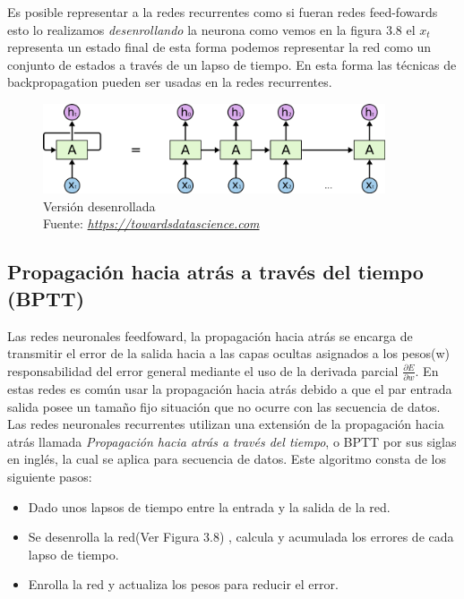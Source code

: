 Es posible representar a la redes recurrentes como si fueran redes feed-fowards esto lo realizamos \textit{desenrollando} la neurona como vemos en la figura 3.8 el $x_{t}$ representa un estado final de esta forma podemos representar la red como un conjunto de estados a través de un lapso de tiempo. En esta forma las técnicas de backpropagation pueden ser usadas en la redes recurrentes.

\begin{figure}[H]
	\centering
	\includegraphics[width=0.9\textwidth]{Figures/rnn2.png}
	\caption{Versión desenrollada \\ Fuente:  \href{https://towardsdatascience.com/introduction-to-recurrent-neural-network-27202c3945f3}{\textit{https://towardsdatascience.com}}}
	\label{}
\end{figure}
\newpage
\subsection{Propagación hacia atrás a través del tiempo (BPTT)}

Las redes neuronales feedfoward, la propagación hacia atrás se encarga de transmitir el error de la salida hacia a las capas ocultas asignados a los pesos(w) responsabilidad del error general mediante el uso de la derivada parcial $\frac{ { \partial } E } { \partial w }$. En estas redes es común usar la propagación hacia atrás debido a que el par entrada salida posee un tamaño fijo situación que no ocurre con las secuencia de datos.\\
 Las redes neuronales recurrentes utilizan una extensión de la propagación hacia atrás llamada \textit{Propagación hacia atrás a través del tiempo}, o BPTT  por sus siglas en inglés, la cual se aplica para secuencia de datos.
Este algoritmo consta de los siguiente pasos:
\begin{itemize}
	\item Dado unos lapsos de tiempo entre la entrada y la salida de la red.
	\item Se desenrolla la red(Ver Figura 3.8) , calcula y acumulada los errores de cada lapso de tiempo.
	\item Enrolla la red y actualiza los pesos para reducir el error.
	
\end{itemize}

